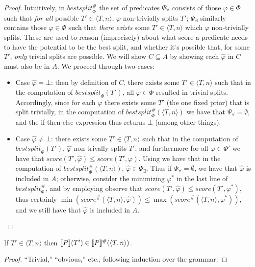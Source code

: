 \begin{proof}
Intuitively, in $\mathit{bestsplit}^\#_\Phi$ the set of predicates
$\Psi_\forall$ consists of those $\varphi \in \Phi$
such that \emph{for all} possible $T' \in \langle T, n \rangle$,
$\varphi$ non-trivially splits $T'$;
$\Psi_\exists$ similarly contains those $\varphi \in \Phi$
such that \emph{there exists} some $T' \in \langle T, n \rangle$
which $\varphi$ non-trivially splits.
These are used to reason (imprecisely) about
\rone what score a predicate needs to have the potential to be the best split, and
\rtwo whether it's possible that, for some $T'$, \emph{only} trivial splits are possible.
We will show $C \subseteq A$ by showing each $\hat{\varphi}$ in $C$ must also be in $A$.
We proceed through two cases:
\begin{itemize}
    \item Case $\hat{\varphi} = \bot$:
        then by definition of $C$, there exists some $T' \in \langle T, n \rangle$
        such that in the computation of $\mathit{bestsplit}_\Phi(T')$,
        all $\varphi \in \Phi$ resulted in trivial splits.
        Accordingly, since for each $\varphi$ there exists some $T'$ (the one fixed prior)
        that is split trivially, in the computation of
        $\mathit{bestsplit}^\#_\Phi(\langle T, n \rangle)$
        we have that $\Psi_\forall = \emptyset$,
        and the if-then-else expression thus returns $\bot$ (among other things).
    \item Case $\hat{\varphi} \neq \bot$:
        there exists some $T' \in \langle T, n \rangle$
        such that in the computation of $\mathit{bestsplit}_\Phi(T')$,
        \rone $\hat{\varphi}$ non-trivally splits $T'$, and furthermore
        \rtwo for all $\varphi \in \Phi'$ we have that
        $\mathit{score}(T', \hat{\varphi}) \leq \mathit{score}(T', \varphi)$.
        Using \rone we have that in the computation of $\mathit{bestsplit}^\#_\Phi(\langle T, n \rangle)$,
        $\hat{\varphi} \in \Psi_\exists$.
        Thus if $\Psi_\forall = \emptyset$, we have that $\hat{\varphi}$ is included in $A$;
        otherwise, consider the minimizing $\varphi^*$ in the last line of $\mathit{bestsplit}^\#_\Phi$,
        and by employing \rtwo observe that $\mathit{score}(T', \hat{\varphi}) \leq \mathit{score}(T', \varphi^*)$,
        thus certainly $\min(\mathit{score}^\#(\langle T, n \rangle, \hat{\varphi})) \leq
        \max(\mathit{score}^\#(\langle T, n \rangle, \varphi^*))$,
        and we still have that $\hat{\varphi}$ is included in $A$.
\end{itemize}
\end{proof}
\begin{theorem}[Soundness]
If $T' \in \langle T, n \rangle$ then $\den{P}(T') \in \den{P}^\#(\langle T, n \rangle)$.
\end{theorem}
\begin{proof}
``Trivial,'' ``obvious,'' etc., following induction over the grammar.
\end{proof}



